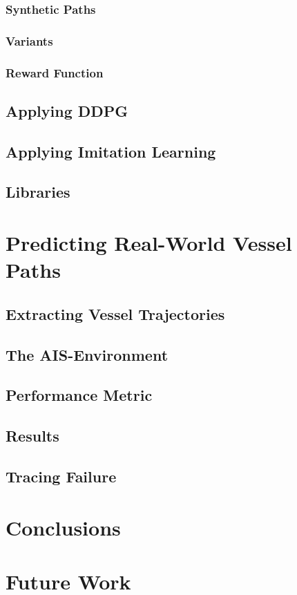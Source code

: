         \subsubsection{Synthetic Paths}
        
        \subsubsection{Variants}
        
        \subsubsection{Reward Function}
        
        
    \subsection{Applying DDPG}
    \subsection{Applying Imitation Learning}
    \subsection{Libraries}
    
    
\newpage
\section{Predicting Real-World Vessel Paths}\label{chap:realworld}

    \subsection{Extracting Vessel Trajectories}
    
    \subsection{The AIS-Environment}
    
    \subsection{Performance Metric}
    
    \subsection{Results}
    \subsection{Tracing Failure}
    
 
\newpage   
\section{Conclusions}
\newpage
\section{Future Work}



